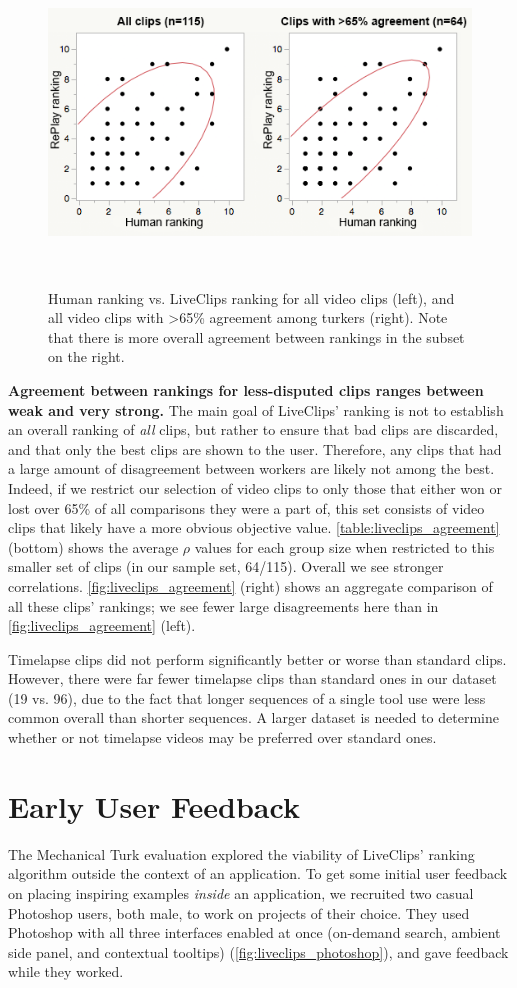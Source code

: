 \begin{figure}[t!]
\centering
  \includegraphics[width=0.65\columnwidth]{liveclips/figures/agreement.png}
  \caption{Human ranking vs. LiveClips ranking for all video clips (left), and all video clips with >65\% agreement among turkers (right). Note that there is more overall agreement between rankings in the subset on the right.}~\label{fig:liveclips_agreement}
\end{figure}


\textbf{Agreement between rankings for less-disputed clips ranges between weak and very strong.} The main goal of LiveClips' ranking is not to establish an overall ranking of \textit{all} clips, but rather to ensure that bad clips are discarded, and that only the best clips are shown to the user. Therefore, any clips that had a large amount of disagreement between workers are likely not among the best. Indeed, if we restrict our selection of video clips to only those that either won or lost over 65\% of all comparisons they were a part of, this set consists of video clips that likely have a more obvious objective value. \autoref{table:liveclips_agreement} (bottom) shows the average $\rho$ values for each group size when restricted to this smaller set of clips (in our sample set, 64/115). Overall we see stronger correlations. \autoref{fig:liveclips_agreement} (right) shows an aggregate comparison of all these clips' rankings; we see fewer large disagreements here than in \autoref{fig:liveclips_agreement} (left).

Timelapse clips did not perform significantly better or worse than standard clips. However, there were far fewer timelapse clips than standard ones in our dataset (19 vs. 96), due to the fact that longer sequences of a single tool use were less common overall than shorter sequences. A larger dataset is needed to determine whether or not timelapse videos may be preferred over standard ones.

\section{Early User Feedback}
The Mechanical Turk evaluation explored the viability of LiveClips' ranking algorithm outside the context of an application. To get some initial user feedback on placing inspiring examples \textit{inside} an application, we recruited two casual Photoshop users, both male, to work on projects of their choice. They used Photoshop with all three interfaces enabled at once (on-demand search, ambient side panel, and contextual tooltips) (\autoref{fig:liveclips_photoshop}), and gave feedback while they worked.

